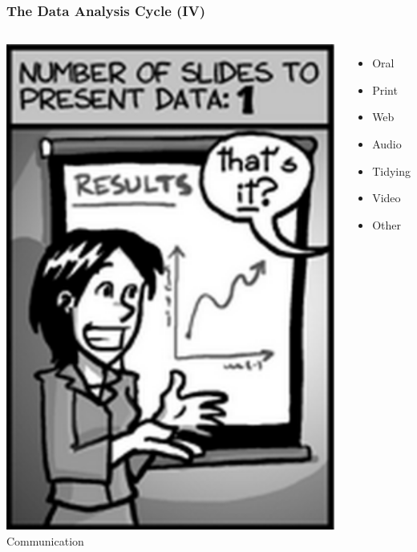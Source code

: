 \documentclass{beamer}
\begin{document}
\begin{frame}
\frametitle{The Data Analysis Cycle (IV)}
\begin{columns}
    \hspace*{1cm}
    \includegraphics[scale=0.4]{./figures/im4.png}
    Communication  
    \begin{itemize}
    \item[] Oral
    \item[] Print
    \item[] Web
    \item[] Audio
    \item[] Tidying
    \item[] Video
    \item[] Other
    \end{itemize}
\end{columns}
\end{frame}
\end{document}
